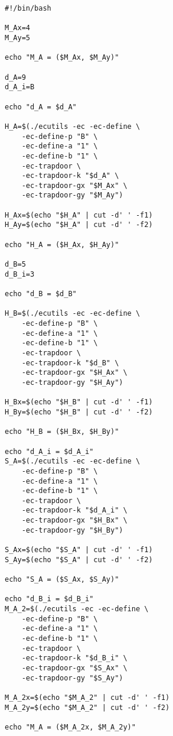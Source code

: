  \label{anexo:db563818-c103-45d8-8c07-544c5ad502b5}
\begin{verbatim}
#!/bin/bash

M_Ax=4
M_Ay=5

echo "M_A = ($M_Ax, $M_Ay)"

d_A=9
d_A_i=B

echo "d_A = $d_A"
    
H_A=$(./ecutils -ec -ec-define \
    -ec-define-p "B" \
    -ec-define-a "1" \
    -ec-define-b "1" \
    -ec-trapdoor \
    -ec-trapdoor-k "$d_A" \
    -ec-trapdoor-gx "$M_Ax" \
    -ec-trapdoor-gy "$M_Ay")

H_Ax=$(echo "$H_A" | cut -d' ' -f1)
H_Ay=$(echo "$H_A" | cut -d' ' -f2)

echo "H_A = ($H_Ax, $H_Ay)"

d_B=5
d_B_i=3

echo "d_B = $d_B"

H_B=$(./ecutils -ec -ec-define \
    -ec-define-p "B" \
    -ec-define-a "1" \
    -ec-define-b "1" \
    -ec-trapdoor \
    -ec-trapdoor-k "$d_B" \
    -ec-trapdoor-gx "$H_Ax" \
    -ec-trapdoor-gy "$H_Ay")

H_Bx=$(echo "$H_B" | cut -d' ' -f1)
H_By=$(echo "$H_B" | cut -d' ' -f2)

echo "H_B = ($H_Bx, $H_By)"

echo "d_A_i = $d_A_i"
S_A=$(./ecutils -ec -ec-define \
    -ec-define-p "B" \
    -ec-define-a "1" \
    -ec-define-b "1" \
    -ec-trapdoor \
    -ec-trapdoor-k "$d_A_i" \
    -ec-trapdoor-gx "$H_Bx" \
    -ec-trapdoor-gy "$H_By")

S_Ax=$(echo "$S_A" | cut -d' ' -f1)
S_Ay=$(echo "$S_A" | cut -d' ' -f2)

echo "S_A = ($S_Ax, $S_Ay)"

echo "d_B_i = $d_B_i"
M_A_2=$(./ecutils -ec -ec-define \
    -ec-define-p "B" \
    -ec-define-a "1" \
    -ec-define-b "1" \
    -ec-trapdoor \
    -ec-trapdoor-k "$d_B_i" \
    -ec-trapdoor-gx "$S_Ax" \
    -ec-trapdoor-gy "$S_Ay")

M_A_2x=$(echo "$M_A_2" | cut -d' ' -f1)
M_A_2y=$(echo "$M_A_2" | cut -d' ' -f2)

echo "M_A = ($M_A_2x, $M_A_2y)"

\end{verbatim}

